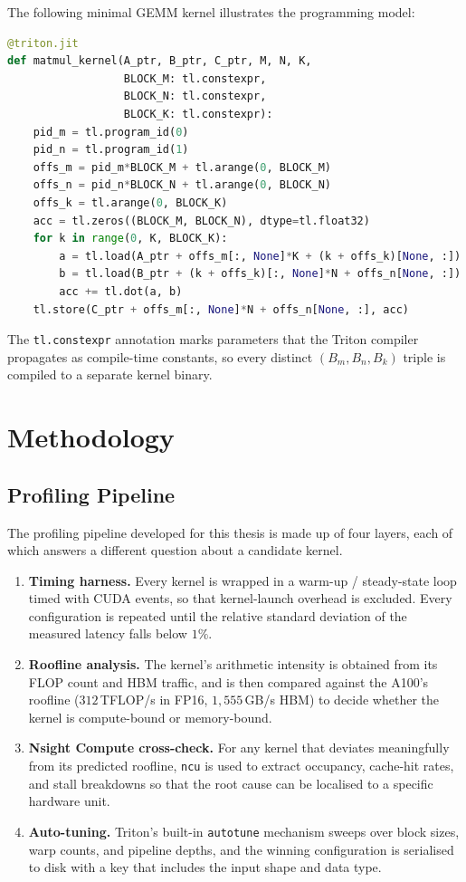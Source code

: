 The following minimal GEMM kernel illustrates the programming
model:
\begin{lstlisting}[language=Python,basicstyle=\ttfamily\scriptsize]
@triton.jit
def matmul_kernel(A_ptr, B_ptr, C_ptr, M, N, K,
                  BLOCK_M: tl.constexpr,
                  BLOCK_N: tl.constexpr,
                  BLOCK_K: tl.constexpr):
    pid_m = tl.program_id(0)
    pid_n = tl.program_id(1)
    offs_m = pid_m*BLOCK_M + tl.arange(0, BLOCK_M)
    offs_n = pid_n*BLOCK_N + tl.arange(0, BLOCK_N)
    offs_k = tl.arange(0, BLOCK_K)
    acc = tl.zeros((BLOCK_M, BLOCK_N), dtype=tl.float32)
    for k in range(0, K, BLOCK_K):
        a = tl.load(A_ptr + offs_m[:, None]*K + (k + offs_k)[None, :])
        b = tl.load(B_ptr + (k + offs_k)[:, None]*N + offs_n[None, :])
        acc += tl.dot(a, b)
    tl.store(C_ptr + offs_m[:, None]*N + offs_n[None, :], acc)
\end{lstlisting}
The \texttt{tl.constexpr} annotation marks parameters that the
Triton compiler propagates as compile-time constants, so every
distinct $(B_m, B_n, B_k)$ triple is compiled to a separate
kernel binary.

\section{Methodology}\label{sec:triton_method}

\subsection{Profiling Pipeline}\label{sec:triton_pipeline}
The profiling pipeline developed for this thesis is made up of
four layers, each of which answers a different question about a
candidate kernel.
\begin{enumerate}
    \item \textbf{Timing harness.} Every kernel is wrapped in a
          warm-up / steady-state loop timed with CUDA events, so
          that kernel-launch overhead is excluded. Every
          configuration is repeated until the relative standard
          deviation of the measured latency falls below $1\%$.
    \item \textbf{Roofline analysis.} The kernel's arithmetic
          intensity is obtained from its FLOP count and HBM
          traffic, and is then compared against the A100's
          roofline ($312$\,TFLOP/s in FP16, $1{,}555$\,GB/s HBM)
          to decide whether the kernel is compute-bound or
          memory-bound.
    \item \textbf{Nsight Compute cross-check.} For any kernel
          that deviates meaningfully from its predicted roofline,
          \texttt{ncu} is used to extract occupancy, cache-hit
          rates, and stall breakdowns so that the root cause can
          be localised to a specific hardware unit.
    \item \textbf{Auto-tuning.} Triton's built-in \texttt{autotune}
          mechanism sweeps over block sizes, warp counts, and
          pipeline depths, and the winning configuration is
          serialised to disk with a key that includes the input
          shape and data type.
\end{enumerate}

